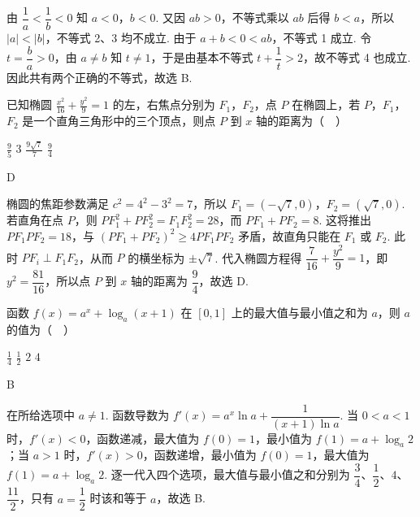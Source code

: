 \begin{solution}
由 \(\dfrac{1}{a}<\dfrac{1}{b}<0\) 知 \(a<0\)，\(b<0\). 又因 \(ab>0\)，不等式乘以 \(ab\) 后得 \(b<a\)，所以 \(|a|<|b|\)，不等式 2、3 均不成立. 由于 \(a+b<0<ab\)，不等式 1 成立. 令 \(t=\dfrac{b}{a}>0\)，由 \(a\ne b\) 知 \(t\ne1\)，于是由基本不等式 \(t+\dfrac1t>2\)，故不等式 4 也成立. 因此共有两个正确的不等式，故选 B.
\end{solution}

\begin{problem}
已知椭圆 \(\frac{x^2}{16} + \frac{y^2}{9} = 1\) 的左，右焦点分别为 \(F_1\)，\(F_2\)，点 \(P\) 在椭圆上，若 \(P\)，\(F_1\)，\(F_2\) 是一个直角三角形中的三个顶点，则点 \(P\) 到 \(x\) 轴的距离为（\(\quad\)）

\choices
    {\(\frac{9}{5}\)}
    {\(3\)}
    {\(\frac{9\sqrt{7}}{7}\)}
    {\(\frac{9}{4}\)}
\end{problem}

\begin{answer}
D
\end{answer}

\begin{solution}
椭圆的焦距参数满足 \(c^2=4^2-3^2=7\)，所以 \(F_1=(-\sqrt7,0)\)，\(F_2=(\sqrt7,0)\). 若直角在点 \(P\)，则 \(PF_1^2+PF_2^2=F_1F_2^2=28\)，而 \(PF_1+PF_2=8\). 这将推出 \(PF_1PF_2=18\)，与 \((PF_1+PF_2)^2\geqslant4PF_1PF_2\) 矛盾，故直角只能在 \(F_1\) 或 \(F_2\). 此时 \(PF_i\perp F_1F_2\)，从而 \(P\) 的横坐标为 \(\pm\sqrt7\). 代入椭圆方程得 \(\dfrac{7}{16}+\dfrac{y^2}{9}=1\)，即 \(y^2=\dfrac{81}{16}\)，所以点 \(P\) 到 \(x\) 轴的距离为 \(\dfrac94\)，故选 D.
\end{solution}

\begin{problem}
函数 \( f(x) = a^x + \log_a(x + 1) \) 在 \([0, 1]\) 上的最大值与最小值之和为 \(a\)，则 \(a\) 的值为（\(\quad\)）

\choices
    {\(\frac{1}{4}\)}
    {\(\frac{1}{2}\)}
    {\(2\)}
    {\(4\)}
\end{problem}

\begin{answer}
B
\end{answer}

\begin{solution}
在所给选项中 \(a\ne1\). 函数导数为 \(f'(x)=a^x\ln a+\dfrac{1}{(x+1)\ln a}\). 当 \(0<a<1\) 时，\(f'(x)<0\)，函数递减，最大值为 \(f(0)=1\)，最小值为 \(f(1)=a+\log_a2\)；当 \(a>1\) 时，\(f'(x)>0\)，函数递增，最小值为 \(f(0)=1\)，最大值为 \(f(1)=a+\log_a2\). 逐一代入四个选项，最大值与最小值之和分别为 \(\dfrac34\)、\(\dfrac12\)、\(4\)、\(\dfrac{11}{2}\)，只有 \(a=\dfrac12\) 时该和等于 \(a\)，故选 B.
\end{solution}

